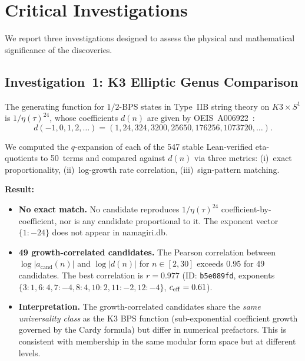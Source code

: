 \section{Critical Investigations}
\label{sec:investigations}

We report three investigations designed to assess the physical and mathematical significance of the \RAMA{} discoveries.

\subsection{Investigation~1: K3 Elliptic Genus Comparison}

The generating function for $1/2$-BPS states in Type~IIB string theory on $K3 \times S^1$ is $1/\eta(\tau)^{24}$, whose coefficients $d(n)$ are given by OEIS~A006922~\cite{strominger_vafa_1996}:
\[
  d(-1, 0, 1, 2, \ldots) = (1, 24, 324, 3200, 25650, 176256, 1073720, \ldots).
\]

We computed the $q$-expansion of each of the 547 stable Lean-verified eta-quotients to 50~terms and compared against $d(n)$ via three metrics: (i)~exact proportionality, (ii)~log-growth rate correlation, (iii)~sign-pattern matching.

\textbf{Result:}
\begin{itemize}
  \item \textbf{No exact match.} No candidate reproduces $1/\eta(\tau)^{24}$ coefficient-by-coefficient, nor is any candidate proportional to it. The exponent vector $\{1: -24\}$ does not appear in namagiri.db.
  \item \textbf{49 growth-correlated candidates.} The Pearson correlation between $\log|a_{\mathrm{cand}}(n)|$ and $\log|d(n)|$ for $n \in [2, 30]$ exceeds 0.95 for 49 candidates. The best correlation is $r = 0.977$ (ID: \texttt{b5e089fd}, exponents $\{3{:}1, 6{:}4, 7{:}{-4}, 8{:}4, 10{:}2, 11{:}{-2}, 12{:}{-4}\}$, $c_{\mathrm{eff}} = 0.61$).
  \item \textbf{Interpretation.} The growth-correlated candidates share the \emph{same universality class} as the K3 BPS function (sub-exponential coefficient growth governed by the Cardy formula) but differ in numerical prefactors. This is consistent with membership in the same modular form space but at different levels.
\end{itemize}


